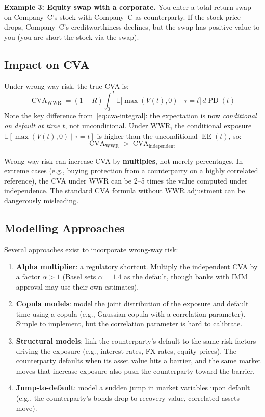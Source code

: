 \documentclass[11pt, a4paper]{article}
\theoremstyle{definition}
\theoremstyle{plain}
\theoremstyle{remark}
\newcommand{\EV}{\mathbb{E}}
\newcommand{\CVA}{\operatorname{CVA}}
\newcommand{\EE}{\operatorname{EE}}
\newcommand{\PD}{\operatorname{PD}}
\begin{document}
\textbf{Example 3: Equity swap with a corporate.}
You enter a total return swap on Company~C's stock with Company~C as counterparty.
If the stock price drops, Company~C's creditworthiness declines, but the swap
has positive value to you (you are short the stock via the swap).

\subsection{Impact on CVA}

Under wrong-way risk, the true CVA is:
\begin{equation}\label{eq:cva-wwr}
    \CVA_{\text{WWR}} = (1 - R)\int_0^T \EV\!\bigl[\max(V(t), 0) \mid \tau = t\bigr]\, d\PD(t)
\end{equation}
Note the key difference from~\eqref{eq:cva-integral}: the expectation is now
\emph{conditional on default at time $t$}, not unconditional.
Under WWR, the conditional exposure $\EV[\max(V(t), 0) \mid \tau = t]$
is higher than the unconditional $\EE(t)$, so:
\[
    \CVA_{\text{WWR}} > \CVA_{\text{independent}}
\]

\begin{warningbox}
Wrong-way risk can increase CVA by \textbf{multiples}, not merely percentages.
In extreme cases (e.g., buying protection from a counterparty on a highly correlated
reference), the CVA under WWR can be 2--5 times the value computed under independence.
The standard CVA formula without WWR adjustment can be dangerously misleading.
\end{warningbox}

\subsection{Modelling Approaches}

Several approaches exist to incorporate wrong-way risk:

\begin{enumerate}
    \item \textbf{Alpha multiplier}: a regulatory shortcut.
          Multiply the independent CVA by a factor $\alpha > 1$ (Basel sets $\alpha = 1.4$
          as the default, though banks with IMM approval may use their own estimates).
    \item \textbf{Copula models}: model the joint distribution of the exposure and
          default time using a copula (e.g., Gaussian copula with a correlation parameter).
          Simple to implement, but the correlation parameter is hard to calibrate.
    \item \textbf{Structural models}: link the counterparty's default to the same
          risk factors driving the exposure (e.g., interest rates, FX rates, equity prices).
          The counterparty defaults when its asset value hits a barrier,
          and the same market moves that increase exposure also push the counterparty
          toward the barrier.
    \item \textbf{Jump-to-default}: model a sudden jump in market variables upon default
          (e.g., the counterparty's bonds drop to recovery value, correlated assets move).
\end{enumerate}
\end{document}

